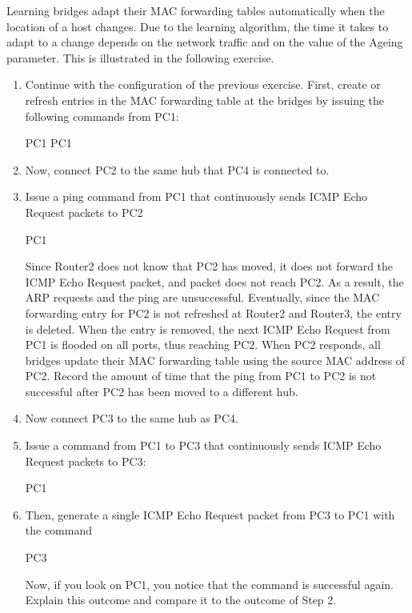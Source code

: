 Learning bridges adapt their MAC forwarding tables automatically when the location of a host changes. Due to the learning algorithm, the time it takes to adapt to a change depends on the network traffic and on the value of the Ageing parameter. This is illustrated in the following exercise.

\begin{enumerate}
	\item Continue with the configuration of the previous exercise. First, create or refresh entries in the MAC forwarding table at the bridges by issuing the following commands from PC1:
		\begin{cmdblock}
	PC1%
	PC1%
		\end{cmdblock}
	\item Now, connect PC2 to the same hub that PC4 is connected to.
	\item Issue a ping command from PC1 that continuously sends ICMP Echo Request packets to PC2
		\begin{cmdblock}
	PC1%
		\end{cmdblock}
		Since Router2 does not know that PC2 has moved, it does not forward the ICMP Echo Request packet, and packet does not reach PC2. As a result, the ARP requests and the ping are unsuccessful. Eventually, since the MAC forwarding entry for PC2 is not refreshed at Router2 and Router3, the entry is deleted. When the entry is removed, the next ICMP Echo Request from PC1 is flooded on all ports, thus reaching PC2. When PC2 responds, all bridges update their MAC forwarding table using the source MAC address of PC2.
		Record the amount of time that the ping from PC1 to PC2 is not successful after PC2 has been moved to a different hub.
	\item Now connect PC3 to the same hub as PC4.
	\item Issue a  command from PC1 to PC3 that continuously sends ICMP Echo Request packets to PC3: 
		\begin{cmdblock}
	PC1%
		\end{cmdblock}
	\item Then, generate a single ICMP Echo Request packet from PC3 to PC1 with the command
		\begin{cmdblock}
	PC3%
		\end{cmdblock}
		Now, if you look on PC1, you notice that the  command is successful again. Explain this outcome and compare it to the outcome of Step 2.
\end{enumerate}

\begin{questions}
\end{questions}
